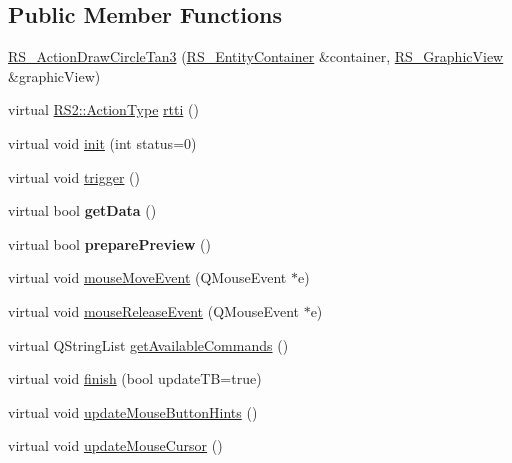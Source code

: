 \subsection*{Public Member Functions}
\begin{DoxyCompactItemize}
\item 
\hyperlink{classRS__ActionDrawCircleTan3_a957b13de04d943d6d8b6d1b0140fec8e}{R\-S\-\_\-\-Action\-Draw\-Circle\-Tan3} (\hyperlink{classRS__EntityContainer}{R\-S\-\_\-\-Entity\-Container} \&container, \hyperlink{classRS__GraphicView}{R\-S\-\_\-\-Graphic\-View} \&graphic\-View)
\item 
virtual \hyperlink{classRS2_afe3523e0bc41fd637b892321cfc4b9d7}{R\-S2\-::\-Action\-Type} \hyperlink{classRS__ActionDrawCircleTan3_a0af2b534c96416c6709963239b267362}{rtti} ()
\item 
virtual void \hyperlink{classRS__ActionDrawCircleTan3_a4b5746d6eb7779580a757ca6de498ba2}{init} (int status=0)
\item 
virtual void \hyperlink{classRS__ActionDrawCircleTan3_a7542915b1e6c1b30f82d0673dfd65a10}{trigger} ()
\item 
\hypertarget{classRS__ActionDrawCircleTan3_ac2f5f9ec6da7a57c559c69b9bac2fd66}{virtual bool {\bfseries get\-Data} ()}\label{classRS__ActionDrawCircleTan3_ac2f5f9ec6da7a57c559c69b9bac2fd66}

\item 
\hypertarget{classRS__ActionDrawCircleTan3_a72b48df2dfe9dd14404d249241720f08}{virtual bool {\bfseries prepare\-Preview} ()}\label{classRS__ActionDrawCircleTan3_a72b48df2dfe9dd14404d249241720f08}

\item 
virtual void \hyperlink{classRS__ActionDrawCircleTan3_a69793fac26d500c642ab12826f8e61fc}{mouse\-Move\-Event} (Q\-Mouse\-Event $\ast$e)
\item 
virtual void \hyperlink{classRS__ActionDrawCircleTan3_a0703bd1ad0d1b559c3755f901323bac2}{mouse\-Release\-Event} (Q\-Mouse\-Event $\ast$e)
\item 
virtual Q\-String\-List \hyperlink{classRS__ActionDrawCircleTan3_ae2b6932b4faa826a187aa80c752cad4a}{get\-Available\-Commands} ()
\item 
virtual void \hyperlink{classRS__ActionDrawCircleTan3_af30d02c9d5c6450baaa501ad0553e77e}{finish} (bool update\-T\-B=true)
\item 
virtual void \hyperlink{classRS__ActionDrawCircleTan3_a7fb3f0890c5776709594e87adf73b796}{update\-Mouse\-Button\-Hints} ()
\item 
virtual void \hyperlink{classRS__ActionDrawCircleTan3_a1eb47db99d76bfd1c515ce9db060021f}{update\-Mouse\-Cursor} ()
\end{DoxyCompactItemize}
